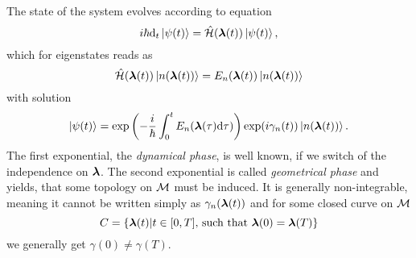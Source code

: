 \citep{berry1984} The state of the system evolves according to \Schrodinger equation
\begin{equation}
    i\hbar \mathrm{d}_t\ket{\psi(t)} = \hat{\mathcal{H}}({\bm\lambda}(t))\ket{\psi(t)},
    \label{eq:schrodinger}
\end{equation}
which for eigenstates reads as
\begin{equation}
    \hat{\mathcal{H}}({\bm\lambda}(t))\ket{n({\bm\lambda}(t))}=E_n({\bm\lambda}(t))\ket{n({\bm\lambda}(t))}
    \label{eq:energySchrodinger}
\end{equation}
with solution
\begin{equation}
    \ket{\psi(t)} = \exp\left(-\frac{i}{\hbar}\int_0^tE_n({\bm\lambda}(\tau)\mathrm{d}\tau)\right)\exp(i\gamma_n(t))\ket{n({\bm\lambda}(t))}.
\end{equation}
The first exponential, the \emph{dynamical phase}, is well known, if we switch of the independence on ${\bm\lambda}$. The second exponential is called \emph{geometrical phase} and yields, that some topology on $\mathcal{M}$ must be induced. It is generally non-integrable, meaning it cannot be written simply as $\gamma_n({\bm\lambda}(t))$ and for some closed curve on $\mathcal{M}$
\begin{equation}
    C=\{{\bm\lambda}(t)|t\in[0,T] \text{, such that }{\bm\lambda}(0)={\bm\lambda}(T)\}
\end{equation} 
we generally get $\gamma(0)\neq \gamma(T)$.

